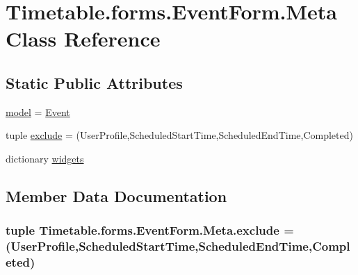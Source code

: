 \hypertarget{classTimetable_1_1forms_1_1EventForm_1_1Meta}{}\section{Timetable.\+forms.\+Event\+Form.\+Meta Class Reference}
\label{classTimetable_1_1forms_1_1EventForm_1_1Meta}
\subsection*{Static Public Attributes}
\begin{DoxyCompactItemize}
\item 
\hyperlink{classTimetable_1_1forms_1_1EventForm_1_1Meta_a02301bd84120cfd745e32233480b8509}{model} = \hyperlink{classTimetable_1_1models_1_1Event}{Event}
\item 
tuple \hyperlink{classTimetable_1_1forms_1_1EventForm_1_1Meta_acefd98c17a710a234e19a1b8b0c73124}{exclude} = (\textquotesingle{}User\+Profile\textquotesingle{},\textquotesingle{}Scheduled\+Start\+Time\textquotesingle{},\textquotesingle{}Scheduled\+End\+Time\textquotesingle{},\textquotesingle{}Completed\textquotesingle{})
\item 
dictionary \hyperlink{classTimetable_1_1forms_1_1EventForm_1_1Meta_ada8de9ad4fda997c8563b1aaa0429f37}{widgets}
\end{DoxyCompactItemize}


\subsection{Member Data Documentation}
\subsubsection[{\texorpdfstring{exclude}{exclude}}]{\setlength{\rightskip}{0pt plus 5cm}tuple Timetable.\+forms.\+Event\+Form.\+Meta.\+exclude = (\textquotesingle{}User\+Profile\textquotesingle{},\textquotesingle{}Scheduled\+Start\+Time\textquotesingle{},\textquotesingle{}Scheduled\+End\+Time\textquotesingle{},\textquotesingle{}Completed\textquotesingle{})\hspace{0.3cm}{\ttfamily [static]}}\hypertarget{classTimetable_1_1forms_1_1EventForm_1_1Meta_acefd98c17a710a234e19a1b8b0c73124}{}\label{classTimetable_1_1forms_1_1EventForm_1_1Meta_acefd98c17a710a234e19a1b8b0c73124}
